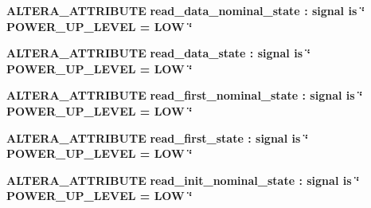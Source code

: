 \begin{DoxyCompactItemize}
\item 
{\bf A\+L\+T\+E\+R\+A\+\_\+\+A\+T\+T\+R\+I\+B\+U\+TE} {\bfseries {\bfseries {\bf read\+\_\+data\+\_\+nominal\+\_\+state}} \textcolor{vhdlchar}{ }\textcolor{vhdlchar}{\+:}\textcolor{vhdlchar}{ }\textcolor{keywordflow}{signal}\textcolor{vhdlchar}{ }\textcolor{keywordflow}{is}\textcolor{vhdlchar}{ }\textcolor{vhdlchar}{ }\textcolor{vhdlchar}{ }\textcolor{vhdlchar}{ }\textcolor{keyword}{\char`\"{} P\+O\+W\+E\+R\+\_\+\+U\+P\+\_\+\+L\+E\+V\+E\+L = L\+O\+W \char`\"{}}\textcolor{vhdlchar}{ }} 
\item 
{\bf A\+L\+T\+E\+R\+A\+\_\+\+A\+T\+T\+R\+I\+B\+U\+TE} {\bfseries {\bfseries {\bf read\+\_\+data\+\_\+state}} \textcolor{vhdlchar}{ }\textcolor{vhdlchar}{\+:}\textcolor{vhdlchar}{ }\textcolor{keywordflow}{signal}\textcolor{vhdlchar}{ }\textcolor{keywordflow}{is}\textcolor{vhdlchar}{ }\textcolor{vhdlchar}{ }\textcolor{vhdlchar}{ }\textcolor{vhdlchar}{ }\textcolor{keyword}{\char`\"{} P\+O\+W\+E\+R\+\_\+\+U\+P\+\_\+\+L\+E\+V\+E\+L = L\+O\+W \char`\"{}}\textcolor{vhdlchar}{ }} 
\item 
{\bf A\+L\+T\+E\+R\+A\+\_\+\+A\+T\+T\+R\+I\+B\+U\+TE} {\bfseries {\bfseries {\bf read\+\_\+first\+\_\+nominal\+\_\+state}} \textcolor{vhdlchar}{ }\textcolor{vhdlchar}{\+:}\textcolor{vhdlchar}{ }\textcolor{keywordflow}{signal}\textcolor{vhdlchar}{ }\textcolor{keywordflow}{is}\textcolor{vhdlchar}{ }\textcolor{vhdlchar}{ }\textcolor{vhdlchar}{ }\textcolor{vhdlchar}{ }\textcolor{keyword}{\char`\"{} P\+O\+W\+E\+R\+\_\+\+U\+P\+\_\+\+L\+E\+V\+E\+L = L\+O\+W \char`\"{}}\textcolor{vhdlchar}{ }} 
\item 
{\bf A\+L\+T\+E\+R\+A\+\_\+\+A\+T\+T\+R\+I\+B\+U\+TE} {\bfseries {\bfseries {\bf read\+\_\+first\+\_\+state}} \textcolor{vhdlchar}{ }\textcolor{vhdlchar}{\+:}\textcolor{vhdlchar}{ }\textcolor{keywordflow}{signal}\textcolor{vhdlchar}{ }\textcolor{keywordflow}{is}\textcolor{vhdlchar}{ }\textcolor{vhdlchar}{ }\textcolor{vhdlchar}{ }\textcolor{vhdlchar}{ }\textcolor{keyword}{\char`\"{} P\+O\+W\+E\+R\+\_\+\+U\+P\+\_\+\+L\+E\+V\+E\+L = L\+O\+W \char`\"{}}\textcolor{vhdlchar}{ }} 
\item 
{\bf A\+L\+T\+E\+R\+A\+\_\+\+A\+T\+T\+R\+I\+B\+U\+TE} {\bfseries {\bfseries {\bf read\+\_\+init\+\_\+nominal\+\_\+state}} \textcolor{vhdlchar}{ }\textcolor{vhdlchar}{\+:}\textcolor{vhdlchar}{ }\textcolor{keywordflow}{signal}\textcolor{vhdlchar}{ }\textcolor{keywordflow}{is}\textcolor{vhdlchar}{ }\textcolor{vhdlchar}{ }\textcolor{vhdlchar}{ }\textcolor{vhdlchar}{ }\textcolor{keyword}{\char`\"{} P\+O\+W\+E\+R\+\_\+\+U\+P\+\_\+\+L\+E\+V\+E\+L = L\+O\+W \char`\"{}}\textcolor{vhdlchar}{ }} 

\end{DoxyCompactItemize}
